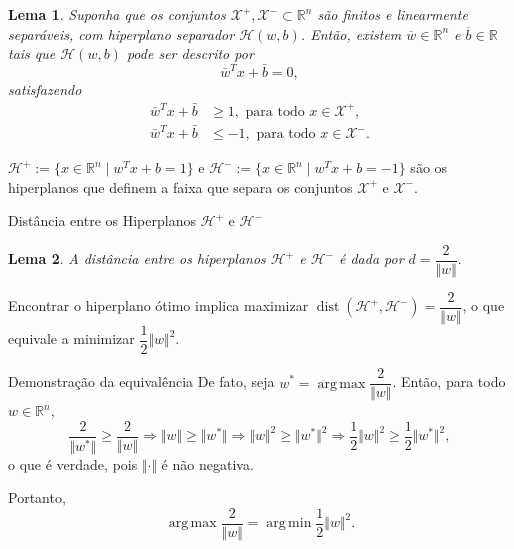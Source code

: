 \documentclass{beamer}
\DeclareMathOperator{\proj}{proj}
\DeclareMathOperator*{\argmax}{arg\, max}
\DeclareMathOperator*{\argmin}{arg\, min}
\DeclareMathOperator{\dist}{dist}
\def\Xset{\mathcal{X}}
\def\Hset{\mathcal{H}}
\def\RR{\mathds{R}}
\def\xbar{\bar{x}}
\def\wbar{\bar{w}}
\def\bbar{\bar{b}}
\newtheorem{prop}{Proposição}
\newtheorem{lema}{Lema}
\theoremstyle{definition}%
\begin{document}
\begin{frame}
\begin{lema} \label{lema1} Suponha que os conjuntos $\Xset^{+}, \Xset^{-} \subset \RR^n$ são finitos e linearmente separáveis, com hiperplano separador $\Hset(w,b)$. Então, existem $\overline{w}\in \RR^n$ e $\overline{b}\in \RR$ tais que $\Hset(w,b)$ pode ser descrito por
\[\wbar^{T}x+\bbar =0,\]
satisfazendo
\begin{align}
\wbar^{T}x+\bbar &\geq 1, \text{ para todo } x\in \Xset^{+}, \label{eq1} \\
\wbar^{T}x+\bbar &\leq -1, \text{ para todo } x\in \Xset^{-}. \label{eq2}
\end{align}
\end{lema} 

$\Hset^{+}:=\{x\in \RR^n \mid w^{T}x+b= 1\}$ e $\Hset^{-}:=\{x\in \RR^n \mid w^{T}x+b= -1\}$ são os hiperplanos que definem a faixa que separa os conjuntos $\Xset^{+}$ e $\Xset^{-}$.
\end{frame}




\begin{frame}{Distância entre os Hiperplanos $\Hset^{+}$ e $\Hset^{-}$}

\begin{lema}\label{lema2} A distância entre os hiperplanos $\Hset^{+}$ e $\Hset^{-}$ é dada por $d=\dfrac{2}{\Vert w\Vert}.$
\end{lema}
Encontrar o hiperplano ótimo implica maximizar $\dist(\Hset^{+} , \Hset^{-}) =\dfrac{2}{\Vert w\Vert }$, o que equivale a minimizar $\dfrac{1}{2}\Vert w\Vert^{2}$.

\end{frame}


\begin{frame}
\begin{block}{Demonstração da equivalência}
De fato, seja $w^{*}=\argmax\dfrac{2}{\Vert w\Vert}$. Então, para todo $w\in \RR^n$,
\[ \dfrac{2}{\Vert w^{*}\Vert} \geq \dfrac{2}{\Vert w\Vert} \Rightarrow \Vert w\Vert \geq \Vert w^{*}\Vert \Rightarrow \Vert w\Vert^{2} \geq \Vert w^{*}\Vert^{2} \Rightarrow \dfrac{1}{2}\Vert w\Vert^{2} \geq \dfrac{1}{2}\Vert w^{*}\Vert^{2}, \]
o que é verdade, pois $\Vert \cdot \Vert$ é não negativa. 

Portanto,
\[ \argmax\dfrac{2}{\Vert w\Vert} = \argmin\dfrac{1}{2}\Vert w\Vert^2. \]
\end{block}
\end{frame}
\end{document}
